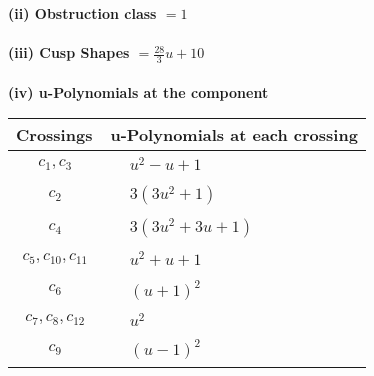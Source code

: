 \documentclass[1p]{elsarticle_modified}
\theoremstyle{definition}
\begin{document}
\flushleft \textbf{(ii) Obstruction class $= 1$}\\~\\
\flushleft \textbf{(iii) Cusp Shapes $= \frac{28}{3} u+10$}\\~\\
\newpage\renewcommand{\arraystretch}{1}
\flushleft \textbf{(iv) u-Polynomials at the component}\newline \\
\begin{tabular}{m{50pt}|m{274pt}}
Crossings & \hspace{64pt}u-Polynomials at each crossing \\
\hline $$\begin{aligned}c_{1},c_{3}\end{aligned}$$&$\begin{aligned}
&u^2- u+1
\end{aligned}$\\
\hline $$\begin{aligned}c_{2}\end{aligned}$$&$\begin{aligned}
&3(3 u^2+1)
\end{aligned}$\\
\hline $$\begin{aligned}c_{4}\end{aligned}$$&$\begin{aligned}
&3(3 u^2+3 u+1)
\end{aligned}$\\
\hline $$\begin{aligned}c_{5},c_{10},c_{11}\end{aligned}$$&$\begin{aligned}
&u^2+u+1
\end{aligned}$\\
\hline $$\begin{aligned}c_{6}\end{aligned}$$&$\begin{aligned}
&(u+1)^2
\end{aligned}$\\
\hline $$\begin{aligned}c_{7},c_{8},c_{12}\end{aligned}$$&$\begin{aligned}
&u^2
\end{aligned}$\\
\hline $$\begin{aligned}c_{9}\end{aligned}$$&$\begin{aligned}
&(u-1)^2
\end{aligned}$\\
\hline
\end{tabular}\\~\\
\end{document}
